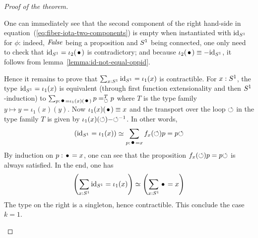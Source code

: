 \documentclass[english,a4paper]{tufte-handout}
\begin{document}
\begin{proof}[Proof of the theorem]
\begin{enumerate}
    One can immediately see that the second component of the right
    hand-side in equation~(\ref{eq:fiber-iota-two-components}) is
    empty when instantiated with $\mathord{\mathrm{id}}_{S^1}$ for $\phi$: indeed,
    $\mathop{\mathit{False}}$ being a proposition and ${S^1}$ being connected, one only
    need to check that $\id_\Sc = \iota_2(\base)$ is contradictory;
    and because $\iota_2(\base) \jdeq -\id_\Sc$, it follows from
    lemma~\ref{lemma:id-not-equal-oppid}.

    Hence it remains to prove that $\sum_{x:{S^1}}\mathord{\mathrm{id}}_{S^1}=\iota_1(x)$ is
    contractible. For $x:{S^1}$, the type $\mathord{\mathrm{id}}_{S^1} = \iota_1(x)$ is
    equivalent (through first function extensionality and then
    ${S^1}$-induction) to
    $\sum_{p:\base=\iota_1(x)(\base)}\pathover p T \Sloop p$ where $T$
    is the type family $y\mapsto y=\iota_1(x)(y)$. Now
    $\iota_1(x)(\base)\jdeq x$ and the transport over the loop
    $\mathord{\circlearrowleft}$ in the type family $T$ is given by
    $\iota_1(x)(\mathord{\circlearrowleft}) \mathord{-} {\mathord{\circlearrowleft}}^{-1}$. In other words,
    \begin{equation}
      \label{eq:10}
      (\id_\Sc = \iota_1(x)) \weq \sum_{p:\base = x}f_x(\Sloop)p = p {\Sloop}
    \end{equation}
    By induction on $p:\base=x$, one can see that the proposition
    $f_x(\mathord{\circlearrowleft})p=p\mathord{\circlearrowleft}$ is always satisfied. In the end, one has
    \begin{equation}
      \label{eq:11}
      \left(\sum_{x:\Sc}\id_\Sc=\iota_1(x)\right)
      \weq
      \left(\sum_{x:\Sc}\base=x\right)
    \end{equation}
    The type on the right is a singleton, hence contractible. This
    conclude the case $k=1$.

\end{enumerate}
\end{proof}
\end{document}
